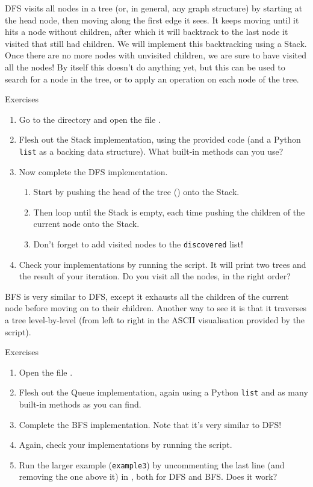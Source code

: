 \documentclass[12pt]{article}
\begin{document}
DFS visits all nodes in a tree (or, in general, any graph structure) by starting at the head node, then moving along the first edge it sees. It keeps moving until it hits a node without children, after which it will backtrack to the last node it visited that still had children. We will implement this backtracking using a Stack. Once there are no more nodes with unvisited children, we are sure to have visited all the nodes! By itself this doesn't do anything yet, but this can be used to search for a node in the tree, or to apply an operation on each node of the tree.
%
\begin{mybox}{Exercises}
    \begin{enumerate}
        \item Go to the directory  and open the file .
        \item Flesh out the Stack implementation, using the provided code (and a Python \texttt{list} as a backing data structure). What built-in methods can you use?
        \item Now complete the DFS implementation.
        \begin{enumerate}
            \item Start by pushing the head of the tree () onto the Stack.
            \item Then loop until the Stack is empty, each time pushing the children of the current node onto the Stack.
            \item Don't forget to add visited nodes to the \texttt{discovered} list!
        \end{enumerate}
        \item Check your implementations by running the script. It will print two trees and the result of your iteration. Do you visit all the nodes, in the right order?
    \end{enumerate}
\end{mybox}
\clearpage

BFS is very similar to DFS, except it exhausts all the children of the current node before moving on to their children. Another way to see it is that it traverses a tree level-by-level (from left to right in the ASCII visualisation provided by the script).
%
\begin{mybox}{Exercises}
    \begin{enumerate}
        \item Open the file .
        \item Flesh out the Queue implementation, again using a Python \texttt{list} and as many built-in methods as you can find.
        \item Complete the BFS implementation. Note that it's very similar to DFS!
        \item Again, check your implementations by running the script.
        \item Run the larger example (\texttt{example3}) by uncommenting the last line (and removing the one above it) in , both for DFS and BFS. Does it work?
    \end{enumerate}
\end{mybox}
\end{document}
